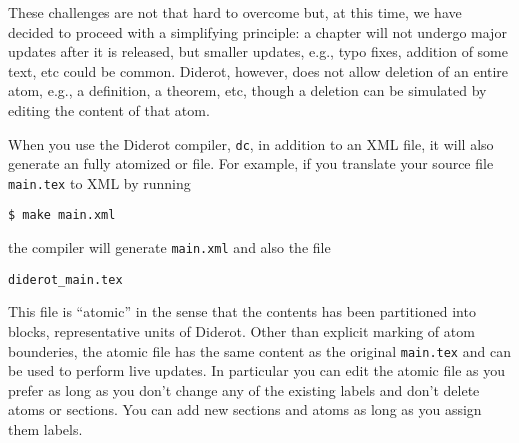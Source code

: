 \begin{gram}
These challenges are not that hard to overcome but, at this time, we have decided to proceed with a simplifying principle: a chapter will not undergo major updates after it is released, but smaller updates, e.g., typo fixes, addition of some text, etc could be common. 
%
Diderot, however, does not allow deletion of an entire atom, e.g., a definition, a theorem, etc, though a deletion can be simulated by editing the content of that atom.
\end{gram}

\begin{gram}
\label{grm:publisg::diderot-atomic}
When you use the Diderot compiler, \lstinline`dc`, in addition to an XML file, it will also generate an fully atomized or  file.  For example, if you translate your source file \lstinline`main.tex` to XML by running

\lstinline`$ make main.xml`

the compiler will generate \lstinline`main.xml` and also the file 

\lstinline`diderot_main.tex`

This file is ``atomic'' in the sense that the contents has been partitioned into  blocks, representative units of Diderot.
%
Other than explicit marking of atom bounderies, the atomic file has the same content as the original \lstinline`main.tex`
%
and can be used to perform live updates. 
%
In particular you can edit the atomic file as you prefer as long as you don't change any of the existing labels and don't delete atoms or sections.  You can add new sections and atoms as long as you assign them labels.
 
\end{gram}


